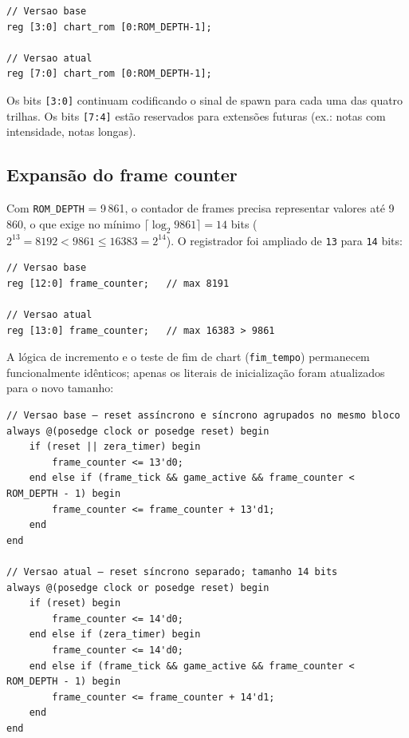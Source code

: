 \documentclass[12pt, a4paper]{article}
\newcommand{\antes}[1]{\textcolor{oldcolor}{\texttt{#1}}}
\newcommand{\depois}[1]{\textcolor{newcolor}{\texttt{#1}}}
\newcommand{\vsig}[1]{\texttt{#1}}
\begin{document}
\begin{lstlisting}[caption={Tipo do array da ROM}]
// Versao base
reg [3:0] chart_rom [0:ROM_DEPTH-1];

// Versao atual
reg [7:0] chart_rom [0:ROM_DEPTH-1];
\end{lstlisting}

Os bits \texttt{[3:0]} continuam codificando o sinal de spawn para cada uma das
quatro trilhas. Os bits \texttt{[7:4]} estão reservados para extensões futuras
(ex.: notas com intensidade, notas longas).

\subsection{Expansão do frame counter}

Com \vsig{ROM\_DEPTH} = 9\,861, o contador de frames precisa representar valores
até 9\,860, o que exige no mínimo $\lceil \log_2 9861 \rceil = 14$ bits
($2^{13} = 8192 < 9861 \leq 16383 = 2^{14}$). O registrador foi ampliado
de \antes{13} para \depois{14} bits:

\begin{lstlisting}[caption={Declaração do frame\_counter}]
// Versao base
reg [12:0] frame_counter;   // max 8191

// Versao atual
reg [13:0] frame_counter;   // max 16383 > 9861
\end{lstlisting}

A lógica de incremento e o teste de fim de chart (\vsig{fim\_tempo}) permanecem
funcionalmente idênticos; apenas os literais de inicialização foram atualizados
para o novo tamanho:

\begin{lstlisting}[caption={Reset e incremento do frame\_counter}]
// Versao base — reset assíncrono e síncrono agrupados no mesmo bloco
always @(posedge clock or posedge reset) begin
    if (reset || zera_timer) begin
        frame_counter <= 13'd0;
    end else if (frame_tick && game_active && frame_counter < ROM_DEPTH - 1) begin
        frame_counter <= frame_counter + 13'd1;
    end
end

// Versao atual — reset síncrono separado; tamanho 14 bits
always @(posedge clock or posedge reset) begin
    if (reset) begin
        frame_counter <= 14'd0;
    end else if (zera_timer) begin
        frame_counter <= 14'd0;
    end else if (frame_tick && game_active && frame_counter < ROM_DEPTH - 1) begin
        frame_counter <= frame_counter + 14'd1;
    end
end
\end{lstlisting}
\end{document}
